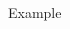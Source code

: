 \documentclass[10pt,compress,t,notes=noshow, xcolor=table]{beamer}
\begin{document}
\begin{frame}{Example}
\begin{columns}[c, totalwidth=\textwidth]
\begin{column}{0.63\textwidth}
\end{column}
\end{columns}

\end{frame}

\end{document}
